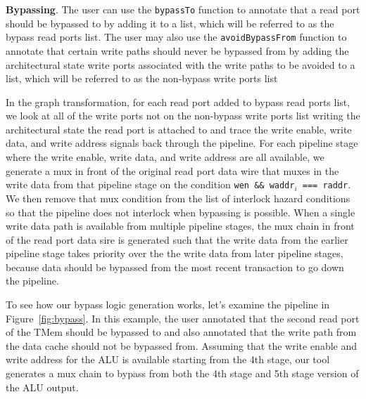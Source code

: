 {\bf Bypassing}. 
The user can use the {\tt bypassTo} function to annotate that a read port should be bypassed to by adding it to a list, which will be referred to as the bypass read ports list. The user may also use the {\tt avoidBypassFrom} function to annotate that certain write paths should never be bypassed from by adding the architectural state write ports associated with the write paths to be avoided to a list, which will be referred to as the non-bypass write ports list

In the graph transformation, for each read port added to bypass read ports
list, we look at all of the write ports not on the non-bypass write
ports list writing the architectural state the read port is attached
to and trace the write enable, write data, and write address signals
back through the pipeline. For each pipeline stage where the write
enable, write data, and write address are all available, we generate a mux in front of the original read port data wire that muxes in the write data from that pipeline stage on the condition {\tt wen \&\& waddr$_i$ === raddr}. We then remove that mux
condition from the list of interlock hazard conditions so that the
pipeline does not interlock when bypassing is possible. When a single write data path is available from multiple pipeline stages, the mux chain in front of the read port data sire is generated such that the write data from the earlier pipeline stage takes priority over the the write data from later pipeline stages, because data should be bypassed from the most recent transaction to go down the pipeline.

To see how our bypass logic generation works, let's examine the pipeline in Figure~\ref{fig:bypass}. In this example, the user annotated that the second read port of the TMem should be bypassed to and also annotated that the write path from the data cache should not be bypassed from. Assuming that the write enable and write address for the ALU is available starting from the 4th stage, our tool generates a mux chain to bypass from both the 4th stage and 5th stage version of the ALU output.
